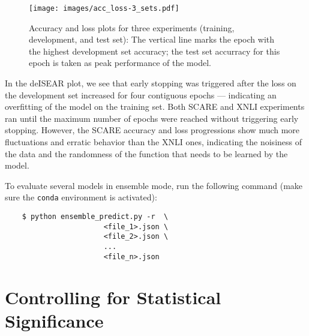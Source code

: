 \begin{figure}[H]
  \begin{center}
    \texttt{[image: images/acc\_loss-3\_sets.pdf]}
  \end{center}
  \caption[Accuracy/Loss plots of three experiments]{Accuracy and loss plots for three
experiments (\textcolor{std-blue}{training}, \textcolor{std-red}{development}, and
\textcolor{std-green}{test} set): The vertical line marks the epoch with the highest
development set accuracy; the test set accurracy for this epoch is taken as peak performance
of the model.}
  \label{fig:acc-loss}
\end{figure}

In the deISEAR plot, we see that early stopping
was triggered after the loss on the development set increased for four contiguous
epochs --- indicating an overfitting of the model on the training set. Both SCARE
and XNLI experiments ran until the maximum number of epochs were reached without
triggering early stopping. However, the SCARE accuracy and loss progressions show
much more fluctuations and erratic behavior than the XNLI ones, indicating the
noisiness of the data and the randomness of the function that needs to be learned
by the model.

\begin{tcolorbox}[
  colback=blue!5!white,
  colframe=blue!75!black,
  title={\centering Code}]

  To evaluate several models in ensemble mode, run the following command (make sure the
\texttt{conda} environment is activated):

  \begin{verbatim}
    $ python ensemble_predict.py -r  \
                       <file_1>.json \
                       <file_2>.json \
                       ...
                       <file_n>.json
  \end{verbatim}

\end{tcolorbox}




\section{Controlling for Statistical Significance}

